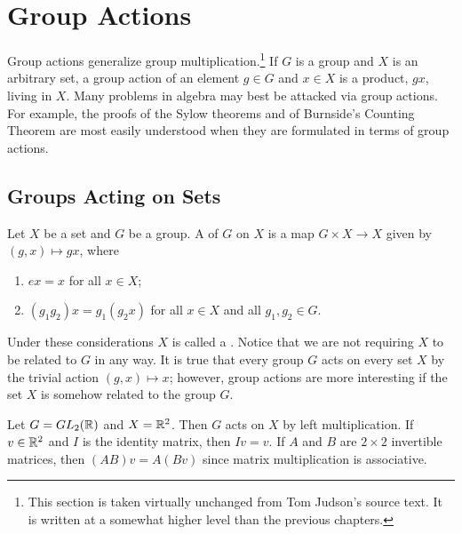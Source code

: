 \chapter{Group Actions}\label{actions}

Group actions generalize group multiplication.\footnote{This section is taken virtually unchanged from Tom Judson's source text. It is written at a somewhat higher level than the previous chapters.}  If $G$ is a group and $X$ is an arbitrary set, a group action of an element $g \in G$ and $x \in X$ is a product, $gx$,  living in $X$.  Many problems in algebra may best be attacked via group actions.  For example, the proofs of the Sylow theorems and of Burnside's Counting Theorem are most easily understood when they are formulated in terms of group actions. 


\section{Groups Acting on Sets}

Let $X$ be a set and $G$ be a group.  A   of $G$ on $X$ is a map $G \times X \rightarrow X$ given by $(g,x) \mapsto gx$, where 
\begin{enumerate}
 
\item 
$ex = x$ for all $x \in X$;
 
\item 
$(g_1 g_2)x = g_1(g_2 x)$ for all $x \in X$ and all $g_1, g_2 \in G$. 
 
\end{enumerate}
Under these considerations $X$ is called a .  Notice that we are not requiring $X$ to be related to $G$ in any way.  It is true that every group $G$ acts on every set $X$ by the trivial action $(g,x) \mapsto x$; however, group actions are more interesting if the set $X$ is somehow related to the group $G$. 

\medskip
 
\begin{example}
Let $G = GL_2( {\Bbb R} )$ and $X = {\Bbb R}^2$. Then $G$ acts on $X$ by left multiplication.  If $v \in {\Bbb R}^2$ and $I$ is the identity matrix, then $Iv = v$.  If $A$ and $B$ are $2 \times 2$ invertible matrices, then $(AB)v = A(Bv)$ since matrix multiplication is
associative. 
\end{example}

